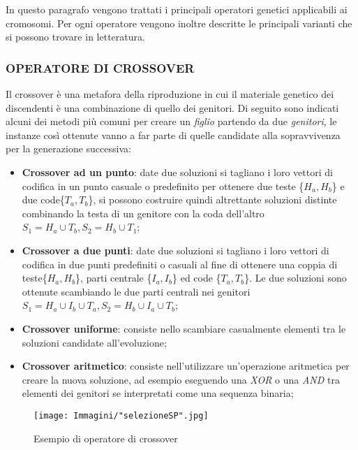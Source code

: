 \documentclass[11pt]{article}
\begin{document}
In questo paragrafo vengono trattati i principali operatori genetici applicabili ai cromosomi. Per ogni operatore vengono inoltre descritte le principali varianti che si possono trovare in letteratura.

\subsubsection*{OPERATORE DI CROSSOVER}
\label{sec:OpCrossoverS}

Il crossover è una metafora della riproduzione in cui il materiale genetico dei discendenti è una combinazione di quello dei genitori. Di seguito sono indicati alcuni dei metodi più comuni per creare un \textit{figlio} partendo da due \textit{genitori}, le instanze così ottenute vanno a far parte di quelle candidate alla sopravvivenza per la generazione successiva:

\begin{itemize}
    \item \textbf{Crossover ad un punto}: date due soluzioni si tagliano i loro vettori di codifica in un punto casuale o predefinito per ottenere due teste \{$H_a, H_b$\} e due code\{$T_a, T_b$\}, si possono costruire quindi altrettante soluzioni distinte combinando la testa di un genitore con la coda dell'altro $S_1 = H_a \cup T_b , S_2 = H_b \cup T_1$;
    
    \item \textbf{Crossover a due punti}: date due soluzioni si tagliano i loro vettori di codifica in due punti predefiniti o casuali al fine di ottenere una coppia di teste\{$H_a, H_b$\}, parti centrale \{$I_a, I_b$\} ed code \{$T_a, T_b$\}. Le due soluzioni sono ottenute scambiando le due parti centrali nei genitori $S_1 = H_a \cup I_b \cup T_a , S_2 = H_b \cup I_a \cup T_b$;
    
    \item \textbf{Crossover uniforme}: consiste nello scambiare casualmente elementi tra le soluzioni candidate all'evoluzione;
    
    \item \textbf{Crossover aritmetico}: consiste nell'utilizzare un'operazione aritmetica per creare la nuova soluzione, ad esempio eseguendo una \textit{XOR} o una \textit{AND} tra elementi dei genitori se interpretati come una sequenza binaria;
\end{itemize}

\begin{figure}[htbp]
    \centering
    \texttt{[image: Immagini/"selezioneSP".jpg]}
    \caption{Esempio di operatore di crossover}
\end{figure}
\end{document}
